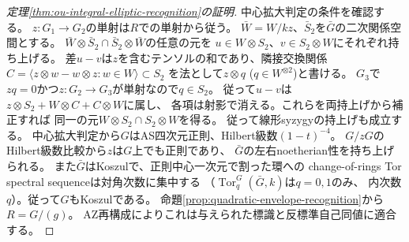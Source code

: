 \begin{proof}[定理\ref{thm:ou-integral-elliptic-recognition}の証明]
中心拡大判定\cite[Corollary~2.7]{LBSVdB1996}の条件を確認する。
$z:G_1\to G_2$の単射は$R$での単射から従う。
$\bar W=W/kz$、$\bar S_2$を$\bar G$の二次関係空間とする。
$\bar W\otimes\bar S_2\cap\bar S_2\otimes\bar W$の任意の元を
$u\in W\otimes S_2$、$v\in S_2\otimes W$にそれぞれ持ち上げる。
差$u-v$は$z$を含むテンソルの和であり、隣接交換関係
$C=\langle z\otimes w-w\otimes z:w\in W\rangle\subset S_2$
を法として$z\otimes q$ ($q\in W^{\otimes2}$)と書ける。
$G_3$で$zq=0$かつ$z:G_2\to G_3$が単射なので$q\in S_2$。
従って$u-v$は$z\otimes S_2+W\otimes C+C\otimes W$に属し、
各項は射影で消える。これらを両持上げから補正すれば
同一の元$W\otimes S_2\cap S_2\otimes W$を得る。
従って線形syzygyの持上げも成立する。
中心拡大判定から$G$はAS四次元正則、Hilbert級数$(1-t)^{-4}$。
$G/zG$のHilbert級数比較から$z$は$G$上でも正則であり、
$\bar G$の左右noetherian性を持ち上げられる。
また$\bar G$はKoszulで、正則中心一次元で割った環への
change-of-rings Tor spectral sequenceは対角次数に集中する
（$\operatorname{Tor}^G_q(\bar G,k)$は$q=0,1$のみ、
内次数$q$）。従って$G$もKoszulである。
命題\ref{prop:quadratic-envelope-recognition}から$R=G/(g)$。
AZ再構成によりこれは与えられた標識と反標準自己同値に適合する。
\end{proof}

